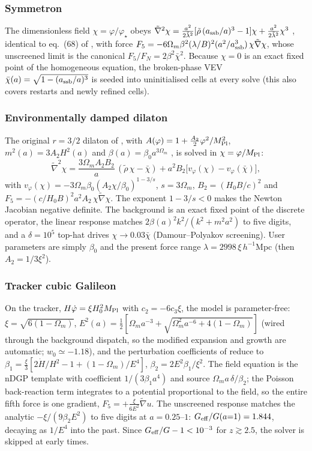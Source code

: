 \documentclass[11pt,a4paper]{article}
\newcommand{\Geff}{G_{\rm eff}}
\newcommand{\Mpl}{M_{\rm Pl}}
\begin{document}
\subsubsection{Symmetron}
The dimensionless field $\chi=\varphi/\varphi_\star$ obeys
$\tilde\nabla^2\chi = \tfrac{a^2}{2\tilde\lambda^2}
[\tilde\rho\,(a_{\rm ssb}/a)^3-1]\chi
+\tfrac{a^2}{2\tilde\lambda^2}\chi^3$
\citep{HinterbichlerKhoury2010,Davis2012}, identical to eq.~(68)
of \citet{Brax2012}, with force
$F_5=-6\Omega_m\beta^2(\lambda/B)^2(a^2/a_{\rm ssb}^3)\,
\chi\tilde\nabla\chi$, whose unscreened limit is the canonical
$F_5/F_N=2\beta^2\bar\chi^2$. Because $\chi=0$ is an exact fixed
point of the homogeneous equation, the broken-phase VEV
$\bar\chi(a)=\sqrt{1-(a_{\rm ssb}/a)^3}$ is seeded into
uninitialised cells at every solve (this also covers restarts and
newly refined cells).

\subsubsection{Environmentally damped dilaton}
The original $r=3/2$ dilaton of \citet{Brax2010}, with
$A(\varphi)=1+\tfrac{A_2}{2}\varphi^2/\Mpl^2$,
$m^2(a)=3A_2H^2(a)$ and $\beta(a)=\beta_0 a^{3\Omega_m}$
\citep{Brax2012}, is solved in $\chi=\varphi/\Mpl$:
\begin{equation}
\tilde\nabla^2\chi
= \frac{3\Omega_m A_2 B_2}{a}\,(\tilde\rho\,\chi-\bar\chi)
+ a^2 B_2\bigl[v_\varphi(\chi)-v_\varphi(\bar\chi)\bigr],
\end{equation}
with $v_\varphi(\chi)=-3\Omega_m\beta_0(A_2\chi/\beta_0)^{1-3/s}$,
$s=3\Omega_m$, $B_2=(H_0B/c)^2$ and
$F_5=-(c/H_0B)^2a^2A_2\,\chi\tilde\nabla\chi$. The exponent
$1-3/s<0$ makes the Newton Jacobian negative definite. The
background is an exact fixed point of the discrete operator, the
linear response matches $2\beta(a)^2k^2/(k^2+m^2a^2)$ to five
digits, and a $\delta=10^5$ top-hat drives $\chi\to0.03\bar\chi$
(Damour--Polyakov screening). User parameters are simply
$\beta_0$ and the present force range
$\lambda = 2998\,\xi\,h^{-1}$Mpc (then $A_2=1/3\xi^2$).

\subsubsection{Tracker cubic Galileon}
On the tracker, $H\dot\varphi=\xi H_0^2\Mpl$ with
$c_2=-6c_3\xi$, the model is parameter-free:
$\xi=\sqrt{6(1-\Omega_m)}$,
$E^2(a)=\tfrac12[\Omega_ma^{-3}+\sqrt{\Omega_m^2a^{-6}+4(1-\Omega_m)}]$
(wired through the background dispatch, so the modified expansion
and growth are automatic; $w_0\simeq-1.18$), and the perturbation
coefficients of \citet{Barreira2013} reduce to
$\beta_1=\tfrac{\xi}{3}[2\dot H/H^2-1+(1-\Omega_m)/E^4]$,
$\beta_2=2E^2\beta_1/\xi^2$. The field equation is the nDGP
template with coefficient $1/(3\beta_1a^4)$ and source
$\Omega_m a\,\delta/\beta_2$; the Poisson back-reaction term
integrates to a potential proportional to the field, so the entire
fifth force is one gradient, $F_5=+\tfrac{\xi}{6E^2}\tilde\nabla u$.
The unscreened response matches the analytic
$-\xi/(9\beta_2E^2)$ to five digits at $a=0.25$--$1$:
$\Geff/G(a{=}1)=1.844$, decaying as $1/E^4$ into the past. Since
$\Geff/G-1<10^{-3}$ for $z\gtrsim2.5$, the solver is skipped at
early times.
\end{document}

